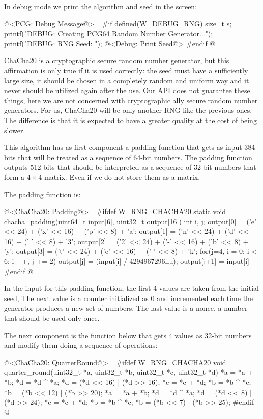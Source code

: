 In debug mode we print the algorithm and seed in the screen:

\iniciocodigo
@<PCG: Debug Message@>=
#if defined(W_DEBUG_RNG)
{
  size_t s;
  printf("DEBUG: Creating PCG64 Random Number Generator...");
  printf("DEBUG: RNG Seed: ");
  @<Debug: Print Seed@>
}
#endif
@
\fimcodigo



ChaCha20 is a cryptographic secure random number generator, but
this affirmation is only true if it is used correctly: the seed must
have a sufficiently large size, it should be chosen in a completely
random and uniform way and it never should be utilized again after
the use. Our API does not guarantee these things, here we are not
concerned with cryptographic ally secure random number generators. For
us, ChaCha20 will be only another RNG like the previous ones. The
difference is that it is expected to have a greater quality at the
cost of being slower.

This algorithm has as first component a padding function that gets as
input 384 bits that will be treated as a sequence of 64-bit
numbers. The padding function outputs 512 bits that should be
interpreted as a sequence of 32-bit numbers that form a $4\times 4$
matrix. Even if we do not store them as a matrix.

The padding function is:

@<ChaCha20: Padding@>=
#ifdef W_RNG_CHACHA20
static void chacha_padding(uint64_t input[6], uint32_t output[16]){
  int i, j;
  output[0] = ('e' << 24) + ('x' << 16) + ('p' << 8) + 'a';
  output[1] = ('n' << 24) + ('d' << 16) + (' ' << 8) + '3';
  output[2] = ('2' << 24) + ('-' << 16) + ('b' << 8) + 'y';
  output[3] = ('t' << 24) + ('e' << 16) + (' ' << 8) + 'k';
  for(j=4, i = 0; i < 6; i ++, j += 2){
    output[j] = (input[i] / 4294967296llu);
    output[j+1] = input[i] %
  }
}
#endif
@

In the input for this padding function, the first 4 values are taken
from the initial seed, The next value is a counter initialized as 0
and incremented each time the generator produces a new set of
numbers. The last value is a nonce, a number that should be used only
once.

The next component is the function below that gets 4 values as 32-bit
numbers and modify them doing a sequence of operations:

@<ChaCha20: QuarterRound@>=
#ifdef W_RNG_CHACHA20
void quarter_round(uint32_t *a, uint32_t *b, uint32_t *c, uint32_t *d){
  *a = *a + *b;
  *d = *d ^ *a;
  *d = (*d << 16) | (*d >> 16);
  *c = *c + *d;
  *b = *b ^ *c;
  *b = (*b << 12) | (*b >> 20);
  *a = *a + *b;
  *d = *d ^ *a;
  *d = (*d << 8) | (*d >> 24);
  *c = *c + *d;
  *b = *b ^ *c;
  *b = (*b << 7) | (*b >> 25);
}
#endif
@

